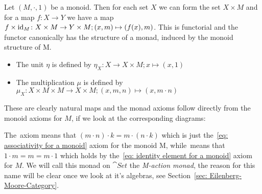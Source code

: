 \begin{example}
    Let $(M,\cdot,1)$ be a monoid. Then for each set $X$ we can form the set $X \times M$ and 
    for a map $f \colon X \to Y$ we have a map $f \times \operatorname{id}_M \colon X \times M \to Y \times M;
    (x,m) \mapsto (f(x),m)$. This is functorial and the functor canonically has the structure of 
    a monad, induced by the monoid structure of M. 
    \begin{itemize}
        \item The unit $\eta$ is defined by
            $\eta_X \colon X \to X \times M;
            x \mapsto (x,1)$
        \item The multiplication $\mu$ is defined by 
           $ \mu_X \colon X \times M \times M \to X \times M;
            (x,m,n) \mapsto (x,m \cdot n)$
    \end{itemize}
    These are clearly natural maps and the monad axioms follow directly from the monoid axioms for $M$,
    if we look at the corresponding diagrams:
    \begin{figure}[H]
    \centering
    \begin{subfigure}{0.4\textwidth}
    \centering 
    \end{subfigure}
    \hspace{2em}
    \begin{subfigure}{0.4\textwidth}
    \centering
    \end{subfigure}
    \end{figure}
    The~ axiom means that $(m \cdot n) \cdot k = m \cdot (n \cdot k)$ 
    which is just the~\ref{eq: associativity for a monoid} axiom for the monoid M,
    while~ means that $1\cdot m = m = m \cdot 1$ which holds by
    the~\ref{eq: identity element for a monoid} axiom for $M$.
    We will call this monad on $\cat{Set}$ the \textit{M-action monad}, the reason for this name will
    be clear once we look at it's algebras, see Section~\ref{sec: Eilenberg-Moore-Category}.
\end{example}
